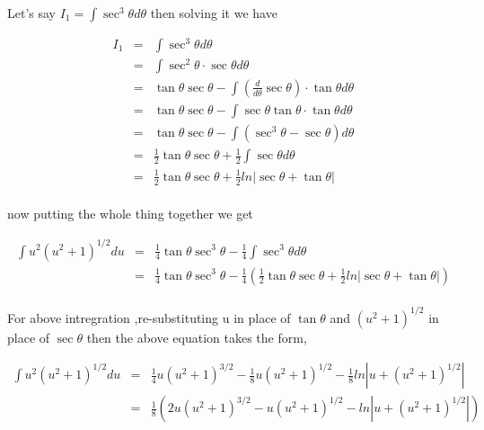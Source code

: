 \documentclass{report}
\begin{document}
\paragraph{ }
Let's say $I_1 = \int \sec^3\theta d\theta$ then solving it we have 
\begin{center}
\begin{eqnarray}
I_1 &=& \int \sec ^3 \theta d\theta \nonumber \\
	&=& \int \sec^2 \theta \cdot \sec \theta d\theta \nonumber \\
	&=& \tan \theta \sec \theta - \int \left(\frac{d}{d\theta}\sec \theta \right) \cdot \tan \theta d\theta \nonumber \\
	&=& \tan \theta \sec \theta  -\int \sec \theta \tan \theta \cdot \tan \theta d\theta \nonumber \\
	&=& \tan \theta \sec \theta  -\int (\sec ^3 \theta - \sec \theta) d\theta \nonumber\\
	&=& \frac{1}{2}\tan \theta \sec \theta  +\frac{1}{2}\int\sec\theta d\theta \nonumber \\
	&=& \frac{1}{2}\tan \theta \sec \theta  +\frac{1}{2}ln| \sec \theta + \tan \theta| \nonumber
\end{eqnarray}
\end{center}
\paragraph{ }
now putting the whole thing together we get
\begin{center}
\begin{eqnarray}
\int u^2(u^2+1)^{1/2}du &=&  \frac{1}{4}\tan \theta \sec ^3 \theta - \frac{1}{4} \int \sec^3 \theta d\theta  \nonumber \\
	&=& \frac{1}{4}\tan \theta \sec ^3 \theta - \frac{1}{4}(\frac{1}{2}\tan \theta \sec \theta  +\frac{1}{2}ln| \sec \theta + \tan \theta|) \nonumber 
\end{eqnarray}
\end{center}
\paragraph{ }
For above intregration ,re-substituting u in place of $\tan \theta $ and $(u^2+1)^{1/2}$ in place of $\sec \theta $ then the above equation takes the form,
\begin{center}
\begin{eqnarray}
\int u^2(u^2+1)^{1/2}du &=&  \frac{1}{4} u (u^2+1)^{3/2} - \frac{1}{8}u(u^2+1)^{1/2} -\frac{1}{8}ln| u +(u^2+1)^{1/2}| \nonumber \\
	&=& \frac{1}{8}\left( 2u(u^2+1)^{3/2} -u(u^2+1)^{1/2} -ln| u +(u^2+1)^{1/2}| \right) \nonumber 
\end{eqnarray}
\end{center}	
\end{document}
